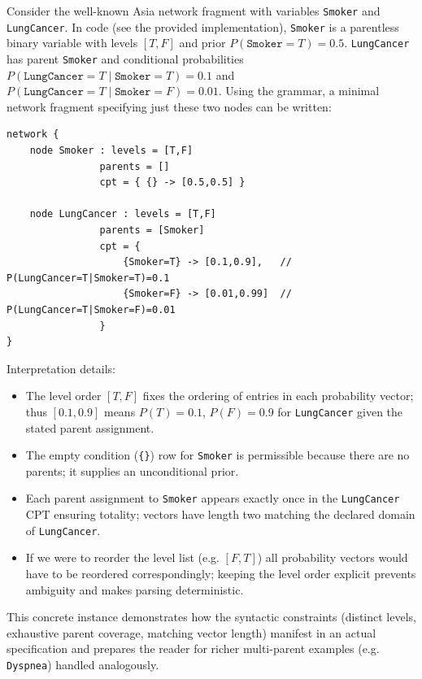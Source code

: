\documentclass[11pt]{article}
\begin{document}
\begin{example}
Consider the well-known Asia network fragment with variables \texttt{Smoker} and \texttt{LungCancer}. In code (see the provided implementation), \texttt{Smoker} is a parentless binary variable with levels $[T,F]$ and prior $P(\texttt{Smoker}=T)=0.5$. \texttt{LungCancer} has parent \texttt{Smoker} and conditional probabilities $P(\texttt{LungCancer}=T\mid \texttt{Smoker}=T)=0.1$ and $P(\texttt{LungCancer}=T\mid \texttt{Smoker}=F)=0.01$. Using the grammar, a minimal network fragment specifying just these two nodes can be written:
\begin{lstlisting}[language=EBNF]
network {
	node Smoker : levels = [T,F]
				parents = []
				cpt = { {} -> [0.5,0.5] }

	node LungCancer : levels = [T,F]
				parents = [Smoker]
				cpt = {
					{Smoker=T} -> [0.1,0.9],   // P(LungCancer=T|Smoker=T)=0.1
					{Smoker=F} -> [0.01,0.99]  // P(LungCancer=T|Smoker=F)=0.01
				}
}
\end{lstlisting}
Interpretation details:
\begin{itemize}[leftmargin=1.4em]
	\item The level order $[T,F]$ fixes the ordering of entries in each probability vector; thus $[0.1,0.9]$ means $P(T)=0.1$, $P(F)=0.9$ for \texttt{LungCancer} given the stated parent assignment.
	\item The empty condition (\texttt{\{\}}) row for \texttt{Smoker} is permissible because there are no parents; it supplies an unconditional prior.
	\item Each parent assignment to \texttt{Smoker} appears exactly once in the \texttt{LungCancer} CPT ensuring totality; vectors have length two matching the declared domain of \texttt{LungCancer}.
	\item If we were to reorder the level list (e.g. $[F,T]$) all probability vectors would have to be reordered correspondingly; keeping the level order explicit prevents ambiguity and makes parsing deterministic.
\end{itemize}
This concrete instance demonstrates how the syntactic constraints (distinct levels, exhaustive parent coverage, matching vector length) manifest in an actual specification and prepares the reader for richer multi-parent examples (e.g. \texttt{Dyspnea}) handled analogously.
\end{example}
\end{document}

